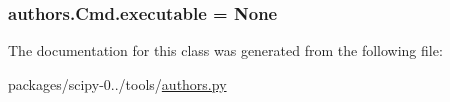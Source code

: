\subsubsection[{executable}]{\setlength{\rightskip}{0pt plus 5cm}authors.\+Cmd.\+executable = None\hspace{0.3cm}{\ttfamily [static]}}\label{classauthors_1_1Cmd_a7e745acf7d354dbd290f9f37f349e36d}


The documentation for this class was generated from the following file\+:\begin{DoxyCompactItemize}
\item 
packages/scipy-\/0../tools/\hyperlink{authors_8py}{authors.\+py}\end{DoxyCompactItemize}
